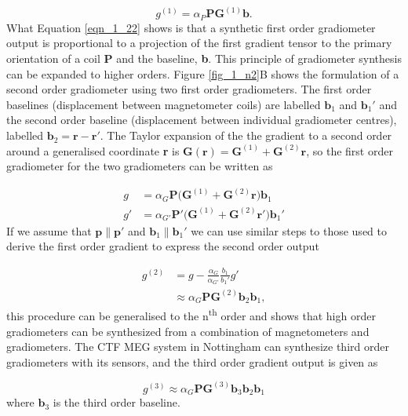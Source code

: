 \begin{equation}
g^{(1)} = \alpha_P\mathbf{P}\mathbf{G}^{(1)}\mathbf{b}. \label{eqn_1_22}
\end{equation} What Equation \ref{eqn_1_22} shows is that a synthetic first order gradiometer output is proportional to a projection of the first gradient tensor to the primary orientation of a coil \textbf{P} and the baseline, \textbf{b}. This principle of gradiometer synthesis can be expanded to higher orders. Figure \ref{fig_1_n2}B shows the formulation of a second order gradiometer using two first order gradiometers. The first order baselines (displacement between magnetometer coils) are labelled $\mathbf{b}_1$ and $\mathbf{b}_1'$ and the second order baseline (displacement between individual gradiometer centres), labelled $\mathbf{b}_2=\mathbf{r}-\mathbf{r}'$. The Taylor expansion of the the gradient to a second order around a generalised coordinate \textbf{r} is $\mathbf{G}(\mathbf{r})=\mathbf{G}^{(1)}+\mathbf{G}^{(2)}\mathbf{r}$, so the first order gradiometer for the two gradiometers can be written as 

\begin{equation}
\begin{aligned}
g &= \alpha_G\mathbf{P}\big(\mathbf{G}^{(1)}+\mathbf{G}^{(2)}\mathbf{r}\big)\mathbf{b}_1\\
g' &=  \alpha_{G'}\mathbf{P}'\big(\mathbf{G}^{(1)}+\mathbf{G}^{(2)}\mathbf{r}'\big)\mathbf{b}_1'
\end{aligned}
\end{equation} If we assume that $\mathbf{p}\parallel\mathbf{p}'$ and $\mathbf{b}_1\parallel\mathbf{b}_1'$ we can use similar steps to those used to derive the first order gradient to express the second order output

\begin{equation}
\begin{aligned}
g^{(2)}&=g-\frac{\alpha_G}{\alpha_{G'}}\frac{b_1}{b_1'}g' \\
&\approx \alpha_G\mathbf{PG}^{(2)}\mathbf{b}_2\mathbf{b}_1,
\end{aligned}
\end{equation} this procedure can be generalised to the n\textsuperscript{th} order and shows that high order gradiometers can be synthesized from a combination of magnetometers and gradiometers. The CTF MEG system in Nottingham can synthesize third order gradiometers with its sensors, and the third order gradient output is given as

\begin{equation}
g^{(3)} \approx \alpha_G\mathbf{PG}^{(3)}\textbf{b}_3\textbf{b}_2\textbf{b}_1
\end{equation} where $\mathbf{b}_3$ is the third order baseline.

